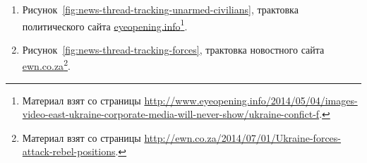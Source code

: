 \documentclass{.local/lib/classes/ndvr-super-article-standalone}
\begin{document}
\begin{enumerate}
\begin{description}
{                    военными на~блокпосте,
                    который те захватили утром в~селе Андреевка,
                    7~км от~центра Славянска, 2 мая 2014 года.»
                }
            \end{description}
        \item Рисунок~\ref{fig:news-thread-tracking-unarmed-civilians},
            трактовка политического сайта
            \href{http://www.eyeopening.info}%
            {eyeopening.info}\footnote{
                Материал взят со страницы 
                \href{http://www.eyeopening.info/2014/05/04/images-video-east-ukraine-corporate-media-will-never-show/ukraine-confict-f}%
                {http://www.eyeopening.info/2014/05/04/images-video-east-ukraine-corporate-media-will-never-show/ukraine-confict-f}.
            }.
        \item Рисунок~\ref{fig:news-thread-tracking-forces},
            трактовка новостного сайта 
            \href{http://ewn.co.za}%
            {ewn.co.za}\footnote{
                Материал взят со страницы 
                \href{http://ewn.co.za/2014/07/01/Ukraine-forces-attack-rebel-positions}
                {http://ewn.co.za/2014/07/01/Ukraine-forces-attack-rebel-positions}.
            }.
    \end{enumerate}
\end{document}
